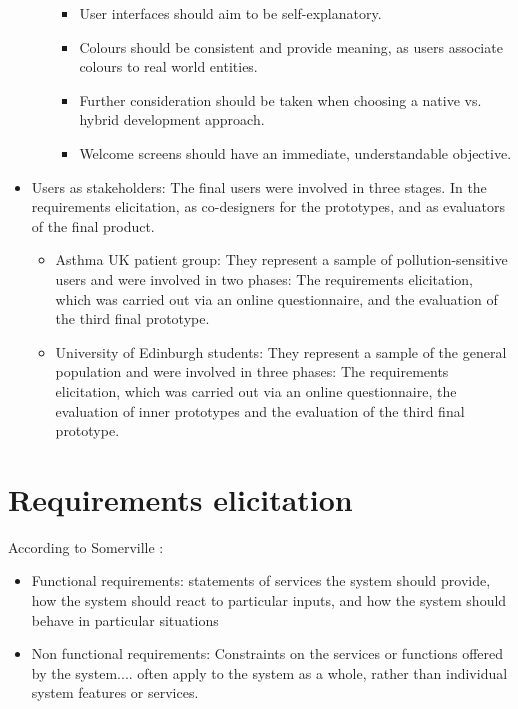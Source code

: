 \begin{itemize}
\begin{itemize}
\begin{itemize}
        \item User interfaces should aim to be self-explanatory. 
        \item Colours should be consistent and provide meaning, as users associate colours to real world entities.
        \item Further consideration should be taken when choosing a native vs. hybrid development approach.
        \item Welcome screens should have an immediate, understandable objective.   
    \end{itemize}

\end{itemize}
    
    \item Users as stakeholders: The final users were involved in three stages. In the requirements elicitation, as co-designers for the prototypes, and as evaluators of the final product. 
    \begin{itemize}
            \item Asthma UK patient group: They represent a sample of pollution-sensitive users and were involved in two phases: The requirements elicitation, which was carried out via an online questionnaire, and the evaluation of the third final prototype.
            \item University of Edinburgh students: They represent a sample of the general population and were involved in three phases: The requirements elicitation, which was carried out via an online questionnaire, the evaluation of inner prototypes and the evaluation of the third final prototype. 
    \end{itemize}
\end{itemize}

\section{Requirements elicitation}
According to Somerville \cite{Sommerville2010}:
\begin{displayquote}
\begin{itemize}

\item Functional requirements: statements of services the system should provide, how the system should react to particular inputs, and how the system should behave in particular situations

\item Non functional requirements: Constraints on the services or functions offered by the system.... often apply to the system as a whole, rather than individual system features or services.


\end{itemize}
\end{displayquote}


